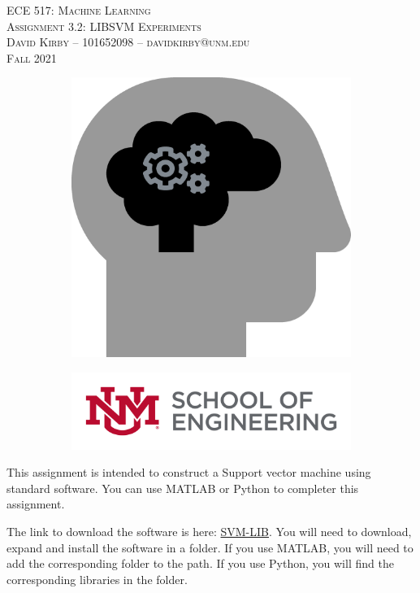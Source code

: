 \documentclass[11pt]{article}
\begin{document}
\setmainfont{SF Pro Text}
\setsansfont{SF Pro Text}
\setmonofont{SF Mono}
\renewcommand{\familydefault}{\sfdefault}


\thispagestyle{empty}
\begin{titlepage}
\vspace*{\fill}
\begin{center}
\textsc{\Huge{ECE 517: Machine Learning}}\\[3em]
\textsc{\LARGE Assignment 3.2: LIBSVM Experiments}\\[6em]
\textsc{\Large David Kirby -- 101652098 -- davidkirby@unm.edu}\\[3em]
\textsc{\Large Fall 2021}
\end{center}
\vfill
\begin{figure}[h]
\begin{subfigure}{0.5\textwidth}
\includegraphics[width=0.25\linewidth]{learning.png}
\end{subfigure}
\begin{subfigure}{0.6\textwidth}\hspace{1em}
\includegraphics[width=0.8\linewidth]{new-soe-logo.png}
\end{subfigure}
\end{figure}
\end{titlepage}
\setcounter{figure}{0}

\hypersetup{
    linkcolor=CrispBlue,
    urlcolor=CrispBlue,
    breaklinks=true
}

This assignment is intended to construct a Support vector machine using standard software. You can use MATLAB or Python to completer this assignment.

The link to download the software is here: \hyperlink{https://www.csie.ntu.edu.tw/~cjlin/libsvm/}{SVM-LIB}. You will need to download, expand and install the software in a folder. If you use MATLAB, you will need to add the corresponding folder to the path. If you use Python, you will find the corresponding libraries in the folder.
\end{document}
